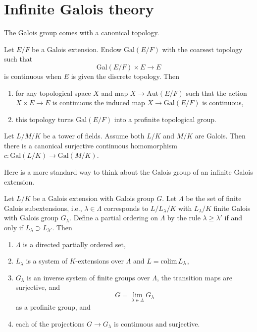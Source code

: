 \chapter{Infinite Galois theory}
\label{section-infinite-galois}

\noindent
The Galois group comes with a canonical topology.

\begin{lemma}\cite[\href{https://stacks.math.columbia.edu/tag/0BMJ}{Lemma 0BMJ}]{stacks-project}
	\label{lemma-galois-profinite}
	Let $E/F$ be a Galois extension. Endow $\text{Gal}(E/F)$ with the coarsest
	topology such that
	$$
	\text{Gal}(E/F) \times E \longrightarrow E
	$$
	is continuous when $E$ is given the discrete topology. Then
	\begin{enumerate}
		\item for any topological space $X$ and map $X \to \text{Aut}(E/F)$
		such that the action $X \times E \to E$ is continuous the induced map
		$X \to \text{Gal}(E/F)$ is continuous,
		\item this topology turns $\text{Gal}(E/F)$ into
		a profinite topological group.
	\end{enumerate}
\end{lemma}



\begin{lemma}\cite[\href{https://stacks.math.columbia.edu/tag/0BMK}{Lemma 0BMK}]{stacks-project}
	\label{lemma-galois-infinite}
	Let $L/M/K$ be a tower of fields. Assume both $L/K$ and
	$M/K$ are Galois. Then there is a canonical surjective continuous
	homomorphism $c : \text{Gal}(L/K) \to \text{Gal}(M/K)$.
\end{lemma}



\noindent
Here is a more standard way to think about
the Galois group of an infinite Galois extension.

\begin{lemma}\cite[\href{https://stacks.math.columbia.edu/tag/0BU2}{Lemma 0BU2}]{stacks-project}
	\label{lemma-infinite-galois-limit}
	Let $L/K$ be a Galois extension with Galois group $G$.
	Let $\Lambda$ be the set of finite Galois subextensions,
	i.e., $\lambda \in \Lambda$ corresponds to $L/L_\lambda/K$
	with $L_\lambda/K$ finite Galois with Galois group $G_\lambda$.
	Define a partial ordering on $\Lambda$ by the rule
	$\lambda \geq \lambda'$ if and only if
	$L_\lambda \supset L_{\lambda'}$. Then
	\begin{enumerate}
		\item $\Lambda$ is a directed partially ordered set,
		\item $L_\lambda$ is a system of $K$-extensions over $\Lambda$
		and $L = \mathop{\mathrm{colim}}\nolimits L_\lambda$,
		\item $G_\lambda$ is an inverse system of finite groups over $\Lambda$,
		the transition maps are surjective, and
		$$
		G = \lim_{\lambda \in \Lambda} G_\lambda
		$$
		as a profinite group, and
		\item each of the projections $G \to G_\lambda$ is continuous and surjective.
	\end{enumerate}
\end{lemma}

